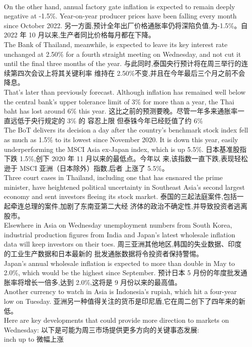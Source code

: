 \documentclass[a4paper,12pt]{article}
\begin{document}
\\On the other hand, annual factory gate inflation is expected to remain deeply negative at -1.5\%. Year-on-year producer prices have been falling every month since October 2022. 另一方面,预计全年出厂价格通胀率仍将深陷负值,为-1.5\%。自 2022 年 10 月以来,生产者同比价格每月都在下降。  
\\The Bank of Thailand, meanwhile, is expected to leave its key interest rate unchanged at 2.50\% for a fourth straight meeting on Wednesday, and not cut it until the final three months of the year. 与此同时,泰国央行预计将在周三举行的连续第四次会议上将其关键利率 维持在 2.50\%不变,并且在今年最后三个月之前不会降息。
\\That's later than previously forecast. Although inflation has remained well below the central bank's upper tolerance limit of 3\% for more than a year, the Thai baht has lost around 6\% this year. 这比之前的预测要晚。尽管一年多来通胀率一直远低于央行规定的 3\% 的 容忍上限 但泰铢今年已经贬值了约 6\%  
\\The BoT delivers its decision a day after the country's benchmark stock index fell as much as 1.5\% to its lowest since November 2020. It is down this year, easily underperforming the MSCI Asia ex-Japan index, which is up 5.5\%. 日本基准股指下跌 1.5\%,创下 2020 年 11 月以来的最低点。今年以 来,该指数一直下跌,表现轻松逊于 MSCI 亚洲（日本除外）指数,后者 上涨了 5.5\%。 
\\Three court cases in Thailand, including one that has ensnared the prime minister, have heightened political uncertainty in Southeast Asia's second largest economy and sent investors fleeing its stock market. 泰国的三起法庭案件,包括一起牵连总理的案件,加剧了东南亚第二大经 济体的政治不确定性,并导致投资者逃离股市。 
\\Elsewhere in Asia on Wednesday unemployment numbers from South Korea, industrial production figures from India and Japan's latest wholesale inflation data will keep investors on their toes. 周三亚洲其他地区,韩国的失业数据、印度的工业生产数据和日本最新的 批发通胀数据将令投资者保持警惕。 
\\Japan's annual wholesale inflation is expected to more than double in May to 2.0\%, which would be the highest since September. 预计日本 5 月份的年度批发通胀率将增长一倍多,达到 2.0\%,这将是 9 月份以来的最高值。 
\\Another currency to watch in Asia is Indonesia's rupiah, which hit a four-year low on Tuesday. 亚洲另一种值得关注的货币是印尼盾,它在周二创下了四年来的新低。 
\\Here are key developments that could provide more direction to markets on Wednesday: 以下是可能为周三市场提供更多方向的关键事态发展:  
\\inch up to 微幅上涨
\end{document}
